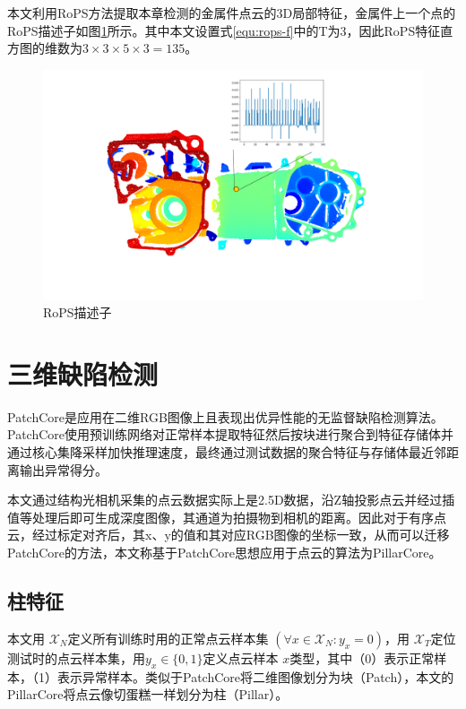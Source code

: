 本文利用RoPS方法提取本章检测的金属件点云的3D局部特征，金属件上一个点的RoPS描述子如图\ref{fig:RoPS_and_histogram}所示。其中本文设置式\ref{equ:rops-f}中的T为3，因此RoPS特征直方图的维数为$3\times3\times5\times3 = 135$。

\begin{figure}[htbp]
    \centering
    \includegraphics[width=1\textwidth]{figures/RoPS_and_histogram.png}
    \caption{RoPS描述子}
    \label{fig:RoPS_and_histogram}
\end{figure}

\section{三维缺陷检测}
PatchCore是应用在二维RGB图像上且表现出优异性能的无监督缺陷检测算法。PatchCore使用预训练网络对正常样本提取特征然后按块进行聚合到特征存储体并通过核心集降采样加快推理速度，最终通过测试数据的聚合特征与存储体最近邻距离输出异常得分。

本文通过结构光相机采集的点云数据实际上是2.5D数据，沿Z轴投影点云并经过插值等处理后即可生成深度图像，其通道为拍摄物到相机的距离。因此对于有序点云，经过标定对齐后，其x、y的值和其对应RGB图像的坐标一致，从而可以迁移PatchCore的方法，本文称基于PatchCore思想应用于点云的算法为PillarCore。
\subsection{柱特征}
本文用 $\mathcal{X}_{N}$定义所有训练时用的正常点云样本集 $\left(\forall x\in \mathcal{X}_{N}: y_{x}=0\right)$，用 $\mathcal{X}_{T}$定位测试时的点云样本集，用$y_{x} \in\{0,1\}$定义点云样本 $x$类型，其中（0）表示正常样本，（1）表示异常样本。类似于PatchCore将二维图像划分为块（Patch），本文的PillarCore将点云像切蛋糕一样划分为柱（Pillar）。

